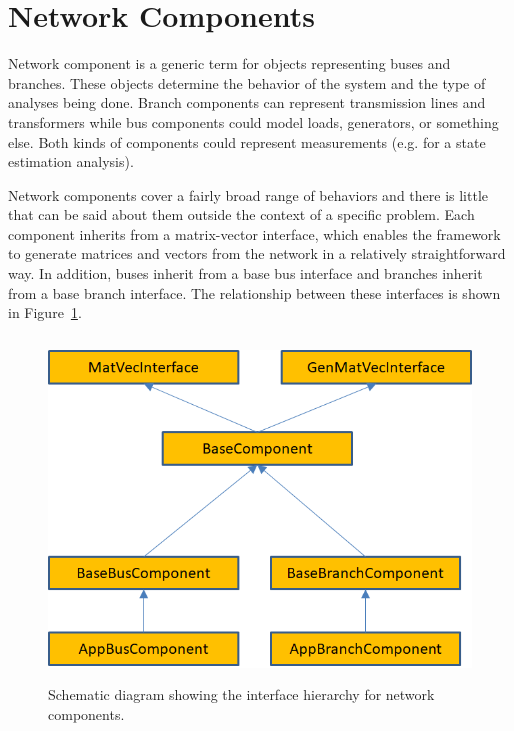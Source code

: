 \section{Network Components}

Network component is a generic term for objects representing buses and branches. These objects determine the behavior of the system and the type of analyses being done. Branch components can represent transmission lines and transformers while bus components could model loads, generators, or something else. Both kinds of components could represent measurements (e.g. for a state estimation analysis). 

Network components cover a fairly broad range of behaviors and there is little
that can be said about them outside the context of a specific problem. Each
component inherits from a matrix-vector interface, which enables the framework
to generate matrices and vectors from the network in a relatively
straightforward way. In addition, buses inherit from a base bus interface and
branches inherit from a base branch interface. The relationship between these
interfaces is shown in Figure~\ref{fig:components}.

\begin{figure}
  \centering
  \includegraphics*[width=6in, height=3.58in, keepaspectratio=true]{figures/Component-hierarchy}
  \caption{Schematic diagram showing the interface hierarchy for network components.}
  \label{fig:components}
\end{figure}



